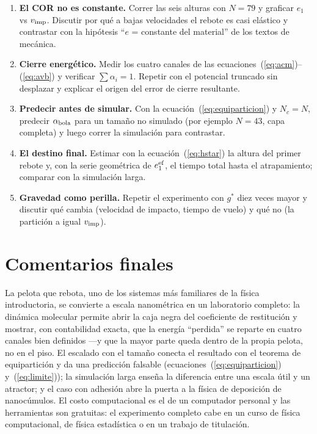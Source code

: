 \documentclass[10pt,a4paper,twocolumn]{article}
\newcommand{\gstar}{g^*}
\begin{document}
\begin{enumerate}
    \item \textbf{El COR no es constante.} Correr las seis alturas con
    $N=79$ y graficar $e_1$ vs $v_{\rm imp}$. Discutir por qué a bajas
    velocidades el rebote es casi elástico y contrastar con la hipótesis
    ``$e$ = constante del material'' de los textos de mecánica.

    \item \textbf{Cierre energético.} Medir los cuatro canales de las
    ecuaciones~(\ref{eq:acm})--(\ref{eq:avb}) y verificar
    $\sum\alpha_i=1$. Repetir con el potencial truncado sin desplazar y
    explicar el origen del error de cierre resultante.

    \item \textbf{Predecir antes de simular.} Con la
    ecuación~(\ref{eq:equiparticion}) y $N_c=N$, predecir
    $\alpha_{\rm bola}$ para un tamaño no simulado (por ejemplo $N=43$,
    capa completa) y luego correr la simulación para contrastar.

    \item \textbf{El destino final.} Estimar con la
    ecuación~(\ref{eq:hstar}) la altura del primer rebote y, con la
    serie geométrica de $e_1^{\rm ef}$, el tiempo total hasta el
    atrapamiento; comparar con la simulación larga.

    \item \textbf{Gravedad como perilla.} Repetir el experimento con
    $\gstar$ diez veces mayor y discutir qué cambia (velocidad de
    impacto, tiempo de vuelo) y qué no (la partición a igual
    $v_{\rm imp}$).
\end{enumerate}

\section{Comentarios finales}
\label{sec:conclusiones}

La pelota que rebota, uno de los sistemas más familiares de la física
introductoria, se convierte a escala nanométrica en un laboratorio
completo: la dinámica molecular permite abrir la caja negra del
coeficiente de restitución y mostrar, con contabilidad exacta, que la
energía ``perdida'' se reparte en cuatro canales bien definidos
---y que la mayor parte queda dentro de la propia pelota, no en el piso.
El escalado con el tamaño conecta el resultado con el teorema de
equipartición y da una predicción falsable
(ecuaciones~(\ref{eq:equiparticion}) y~(\ref{eq:limite})); la simulación
larga enseña la diferencia entre una escala útil y un atractor; y el caso
con adhesión abre la puerta a la física de deposición de nanocúmulos. El
costo computacional es el de un computador personal y las herramientas
son gratuitas: el experimento completo cabe en un curso de física
computacional, de física estadística o en un trabajo de titulación.
\end{document}

